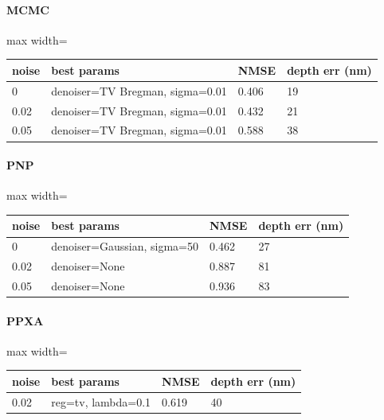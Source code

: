 \paragraph{MCMC}
\begin{center}\begin{adjustbox}{max width=\linewidth}
\begin{tabular}{llll}
\toprule
noise & best params & NMSE & depth err (nm) \\
\midrule
0 & denoiser=TV Bregman, sigma=0.01 & 0.406 & 19 \\
0.02 & denoiser=TV Bregman, sigma=0.01 & 0.432 & 21 \\
0.05 & denoiser=TV Bregman, sigma=0.01 & 0.588 & 38 \\
\bottomrule
\end{tabular}\end{adjustbox}\end{center}
\paragraph{PNP}
\begin{center}\begin{adjustbox}{max width=\linewidth}
\begin{tabular}{llll}
\toprule
noise & best params & NMSE & depth err (nm) \\
\midrule
0 & denoiser=Gaussian, sigma=50 & 0.462 & 27 \\
0.02 & denoiser=None & 0.887 & 81 \\
0.05 & denoiser=None & 0.936 & 83 \\
\bottomrule
\end{tabular}\end{adjustbox}\end{center}
\paragraph{PPXA}
\begin{center}\begin{adjustbox}{max width=\linewidth}
\begin{tabular}{llll}
\toprule
noise & best params & NMSE & depth err (nm) \\
\midrule
0.02 & reg=tv, lambda=0.1 & 0.619 & 40 \\
\bottomrule
\end{tabular}\end{adjustbox}\end{center}
